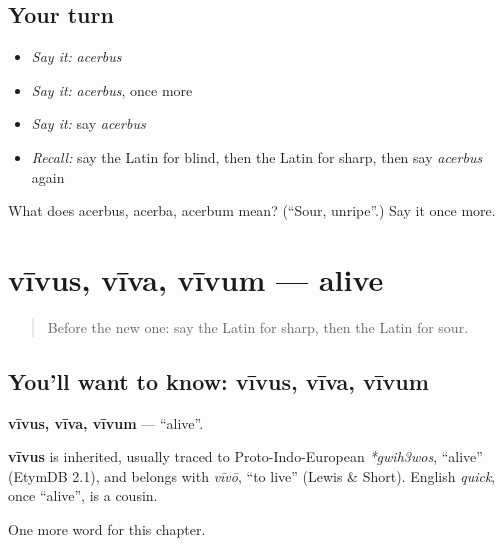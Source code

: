 \subsection*{Your turn}
\begin{itemize}
\raggedright
  \item \emph{Say it:} \emph{acerbus}
  \item \emph{Say it:} \emph{acerbus}, once more
  \item \emph{Say it:} say \emph{acerbus}
  \item \emph{Recall:} say the Latin for blind, then the Latin for sharp, then say \emph{acerbus} again
\end{itemize}

\begin{tcolorbox}[breakable,colback=teal!4,colframe=teal!35!black,title={Before you move on}]
What does acerbus, acerba, acerbum mean? (\textquotedblleft{}Sour, unripe\textquotedblright{}.) Say it once more.
\end{tcolorbox}
\section[vīvus, vīva, vīvum]{vīvus, vīva, vīvum — alive}

\label{lesson:LA-C145-vivus}



\begin{quote}
Before the new one: say the Latin for sharp, then the Latin for sour.
\end{quote}

\subsection*{You'll want to know: vīvus, vīva, vīvum}
\textbf{vīvus, vīva, vīvum} — \textquotedblleft{}alive\textquotedblright{}.

\begin{cousinweb}
\textbf{vīvus} is inherited, usually traced to Proto-Indo-European \emph{*gwih3wos}, \textquotedblleft{}alive\textquotedblright{} (EtymDB 2.1), and belongs with \emph{vīvō}, \textquotedblleft{}to live\textquotedblright{} (Lewis \& Short). English \emph{quick}, once \textquotedblleft{}alive\textquotedblright{}, is a cousin.
\end{cousinweb}

\begin{grammarlens}[title={What you've built}]
One more word for this chapter.
\end{grammarlens}


